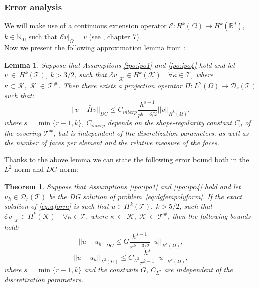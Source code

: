 \documentclass[12pt, a4paper]{article}
\theoremstyle{definition}
\theoremstyle{plain}
\newtheorem{lemma}{Lemma}
\theoremstyle{plain}
\newtheorem{teor}{Theorem}
\theoremstyle{definition}
\begin{document}
\subsubsection{Error analysis}
We will make use of a continuous extension operator 
$\mathcal{E}:H^k(\Omega)\rightarrow 
H^k(\mathbb{R}^d)$, $k\in\mathbb{N}_0$, such that 
$\mathcal{E}v|_\Omega=v$ (see \cite{salsa}, chapter 7).\\
Now we present the following approximation lemma from \cite{multigrid}:
\begin{lemma}  \label{lemma:interp}
	Suppose that Assumptions \ref{ipo:ipo1} and \ref{ipo:ipo4} hold and let 
	$v~\in~H^k(\mathcal{T})$, $k>3/2$, such that 
	$\mathcal{E}v|_\mathcal{K}\in H^k(\mathcal{K}) \quad \forall 
	\kappa\in\mathcal{T}$, where $\kappa\subset\mathcal{K}, \; 
	\mathcal{K}~\in~\mathcal{T}^\#$. Then there exists a projection operator 
	$\bar{\Pi}: L^2(\Omega)\rightarrow\mathcal{D}_r(\mathcal{T})$ such that:
	\begin{equation}
		\big|\!\big| v - \bar{\Pi}v \big|\!\big|_{DG}
		\leq C_{interp} \frac{h^{s-1}}{r^{k-3/2}} |\!| v |\!|_{H^k(\Omega)},
	\end{equation}
	where $s = \min \{r+1, k\}$, $C_{interp}$ depends on the shape-regularity constant $C_d$ of the covering $\mathcal{T}^\#$, but is independent of the discretization parameters, as well as the number of faces per element and the relative measure of the faces.
\end{lemma}
Thanks to the above lemma we can state the following error bound both in the 
$L^2$-norm and $DG$-norm:
\begin{teor} \label{teo:convergence}
	Suppose that Assumptions \ref{ipo:ipo1} and \ref{ipo:ipo4} hold and let 
	$u_h \in \mathcal{D}_r(\mathcal{T})$ be the DG solution of 
	problem~\eqref{eq:dgfempolyform}. If the exact solution of \eqref{eq:wform} 
	is such that $u\in H^k(\mathcal{T}), \; k>5/2$, such that 
	$\mathcal{E}v|_\mathcal{K}\in H^k(\mathcal{K}) \quad \forall 
	\kappa\in\mathcal{T}$, where $\kappa~\subset~\mathcal{K}, \; 
	\mathcal{K}~\in~\mathcal{T}^\#$, then the following bounds hold:
	\begin{equation} \label{eq:dgbound}
		|\!|u-u_h|\!|_{DG} \leq G \frac{h^{s-1}}{r^{k-3/2}} 
		|\!|u|\!|_{H^s(\Omega)},
	\end{equation}
	\begin{equation} \label{eq:l2bound}
		|\!|u-u_h|\!|_{L^2(\Omega)} \leq C_{L^2} \frac{h^s}{r^{k-1}} 
		|\!|u|\!|_{H^s(\Omega)},
	\end{equation}
	where $s = \min \{r+1, k\}$ and the constants $G$, $C_{L^2}$ are independent of the discretization parameters.
\end{teor}
\end{document}

